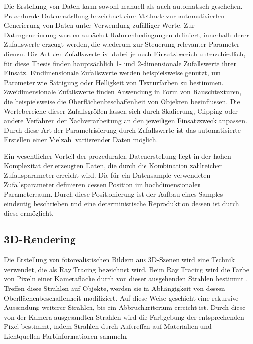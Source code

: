 Die Erstellung von Daten kann sowohl manuell als auch automatisch geschehen. Prozedurale Datenerstellung bezeichnet eine Methode zur automatisierten Generierung von Daten unter Verwendung zufälliger Werte. Zur Datengenerierung werden zunächst Rahmenbedingungen definiert, innerhalb derer Zufallswerte erzeugt werden, die wiederum zur Steuerung relevanter Parameter dienen. Die Art der Zufallswerte ist dabei je nach Einsatzbereich unterschiedlich; für diese Thesis finden hauptsächlich 1- und 2-dimensionale Zufallswerte ihren Einsatz. Eindimensionale Zufallswerte werden beispielsweise genutzt, um Parameter wie Sättigung oder Helligkeit von Texturfarben zu bestimmen. Zweidimensionale Zufallswerte finden Anwendung in Form von Rauschtexturen, die beispielsweise die Oberflächenbeschaffenheit von Objekten beeinflussen. Die Wertebereiche dieser Zufallsgrößen lassen sich durch Skalierung, Clipping oder andere Verfahren der Nachverarbeitung an den jeweiligen Einsatzzweck anpassen. Durch diese Art der Parametrisierung durch Zufallswerte ist das automatisierte Erstellen einer Vielzahl variierender Daten möglich.

Ein wesentlicher Vorteil der prozeduralen Datenerstellung liegt in der hohen Komplexität der erzeugten Daten, die durch die Kombination zahlreicher Zufallsparameter erreicht wird. Die für ein Datensample verwendeten Zufallsparameter definieren dessen Position im hochdimensionalen Parameterraum. Durch diese Positionierung ist der Aufbau eines Samples eindeutig beschrieben und eine deterministische Reproduktion dessen ist durch diese ermöglicht.


\subsection{3D-Rendering}
\label{sec:3d_rendering}

Die Erstellung von fotorealistischen Bildern aus 3D-Szenen wird eine Technik verwendet, die als Ray Tracing bezeichnet wird. Beim Ray Tracing wird die Farbe von Pixeln einer Kamerafläche durch von dieser ausgehenden Strahlen bestimmt \cite{ray_tracing,ray_tracing_distributed,ray_tracing_equations}. Treffen diese Strahlen auf Objekte, werden sie in Abhängigkeit von dessen Oberflächenbeschaffenheit modifiziert. Auf diese Weise geschieht eine rekursive Aussendung weiterer Strahlen, bis ein Abbruchkriterium erreicht ist. Durch diese von der Kamera ausgesandten Strahlen wird die Farbgebung der entsprechenden Pixel bestimmt, indem Strahlen durch Auftreffen auf Materialien und Lichtquellen Farbinformationen sammeln.

